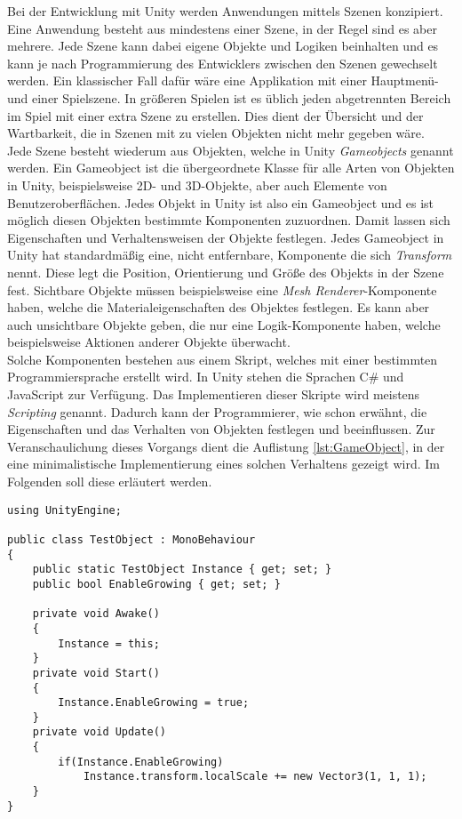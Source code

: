 Bei der Entwicklung mit Unity werden Anwendungen mittels Szenen konzipiert. Eine Anwendung besteht aus mindestens einer Szene, in der Regel sind es aber mehrere. Jede Szene kann dabei eigene Objekte und Logiken beinhalten und es kann je nach Programmierung des Entwicklers zwischen den Szenen gewechselt werden. Ein klassischer Fall dafür wäre eine Applikation mit einer Hauptmenü- und einer Spielszene. In größeren Spielen ist es üblich jeden abgetrennten Bereich im Spiel mit einer extra Szene zu erstellen. Dies dient der Übersicht und der Wartbarkeit, die in Szenen mit zu vielen Objekten nicht mehr gegeben wäre.\\

Jede Szene besteht wiederum aus Objekten, welche in Unity \textit{Gameobjects} genannt werden. Ein Gameobject ist die übergeordnete Klasse für alle Arten von Objekten in Unity, beispielsweise 2D- und 3D-Objekte, aber auch Elemente von Benutzeroberflächen. Jedes Objekt in Unity ist also ein Gameobject und es ist möglich diesen Objekten bestimmte Komponenten zuzuordnen. Damit lassen sich Eigenschaften und Verhaltensweisen der Objekte festlegen. Jedes Gameobject in Unity hat standardmäßig eine, nicht entfernbare, Komponente die sich \textit{Transform} nennt. Diese legt die Position, Orientierung und Größe des Objekts in der Szene fest. Sichtbare Objekte müssen beispielsweise eine \textit{Mesh Renderer}-Komponente haben, welche die Materialeigenschaften des Objektes festlegen. Es kann aber auch unsichtbare Objekte geben, die nur eine Logik-Komponente haben, welche beispielsweise Aktionen anderer Objekte überwacht.\\

Solche Komponenten bestehen aus einem Skript, welches mit einer bestimmten Programmiersprache erstellt wird. In Unity stehen die Sprachen C\# und JavaScript zur Verfügung. Das Implementieren dieser Skripte wird meistens \textit{Scripting} genannt. Dadurch kann der Programmierer, wie schon erwähnt, die Eigenschaften und das Verhalten von Objekten festlegen und beeinflussen. Zur Veranschaulichung dieses Vorgangs dient die Auflistung \ref{lst:GameObject}, in der eine minimalistische Implementierung eines solchen Verhaltens gezeigt wird. Im Folgenden soll diese erläutert werden.\\

\begin{lstlisting}[caption={Grundaufbei eines Gameobjects in Unity}, captionpos=t, label=lst:GameObject]
using UnityEngine;

public class TestObject : MonoBehaviour
{
    public static TestObject Instance { get; set; }
    public bool EnableGrowing { get; set; }

    private void Awake()
    {
        Instance = this;
    }
    private void Start()
    {
        Instance.EnableGrowing = true;
    }
    private void Update()
    {
    	if(Instance.EnableGrowing)
        	Instance.transform.localScale += new Vector3(1, 1, 1);
    }
}
\end{lstlisting}
\quad



